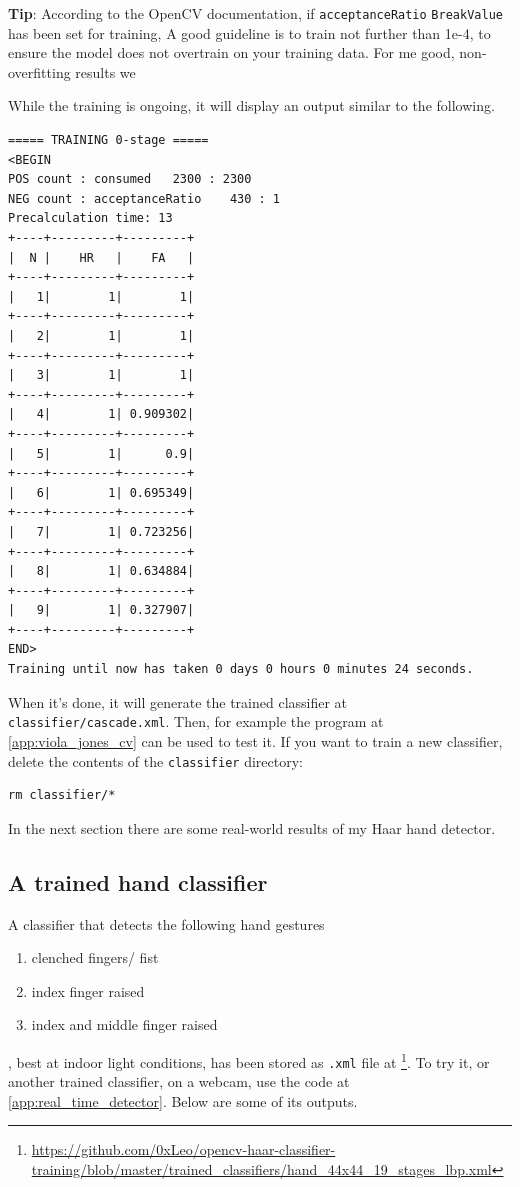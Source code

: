 \documentclass[a4paper]{article}
\begin{document}
\textbf{Tip}: According to the OpenCV documentation, if \texttt{acceptanceRatio}
\texttt{BreakValue} has been set for training, A good guideline is to train not further than 1e-4, to ensure the model does not overtrain on your training data. For me good, non-overfitting results we

While the training is ongoing, it will display an output similar to the following.
\begin{verbatim}
===== TRAINING 0-stage =====
<BEGIN
POS count : consumed   2300 : 2300
NEG count : acceptanceRatio    430 : 1
Precalculation time: 13
+----+---------+---------+
|  N |    HR   |    FA   |
+----+---------+---------+
|   1|        1|        1|
+----+---------+---------+
|   2|        1|        1|
+----+---------+---------+
|   3|        1|        1|
+----+---------+---------+
|   4|        1| 0.909302|
+----+---------+---------+
|   5|        1|      0.9|
+----+---------+---------+
|   6|        1| 0.695349|
+----+---------+---------+
|   7|        1| 0.723256|
+----+---------+---------+
|   8|        1| 0.634884|
+----+---------+---------+
|   9|        1| 0.327907|
+----+---------+---------+
END>
Training until now has taken 0 days 0 hours 0 minutes 24 seconds.
\end{verbatim}
When it's done, it will generate the trained classifier at \texttt{classifier/cascade.xml}. Then, for example the program at \ref{app:viola_jones_cv} can be used to test it. If you want to train a new classifier, delete the contents of the \texttt{classifier} directory:
\begin{lstlisting}[style=terminal]
rm classifier/*
\end{lstlisting}
In the next section there are some real-world results of my Haar hand detector.


\subsection{A trained hand classifier}

A classifier that detects the following hand gestures 
\begin{enumerate}
    \item clenched fingers/ fist
    \item index finger raised
    \item index and middle finger raised
\end{enumerate}
, best at indoor light conditions, has been stored as \texttt{.xml} file at \footnote{\faExternalLinkSquare \; \url{https://github.com/0xLeo/opencv-haar-classifier-training/blob/master/trained_classifiers/hand_44x44_19_stages_lbp.xml}}. To try it, or another trained classifier, on a webcam, use the code at \ref{app:real_time_detector}. Below are some of its outputs.
\end{document}
